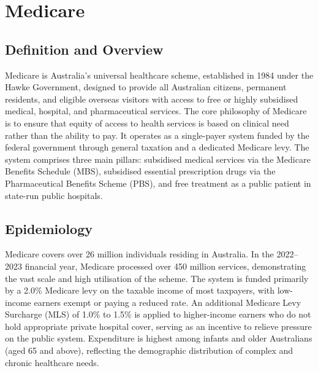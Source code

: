 \chapter{Medicare}

\section*{Definition and Overview}
Medicare is Australia's universal healthcare scheme, established in 1984 under the Hawke Government, designed to provide all Australian citizens, permanent residents, and eligible overseas visitors with access to free or highly subsidised medical, hospital, and pharmaceutical services. The core philosophy of Medicare is to ensure that equity of access to health services is based on clinical need rather than the ability to pay. It operates as a single-payer system funded by the federal government through general taxation and a dedicated Medicare levy. The system comprises three main pillars: subsidised medical services via the Medicare Benefits Schedule (MBS), subsidised essential prescription drugs via the Pharmaceutical Benefits Scheme (PBS), and free treatment as a public patient in state-run public hospitals.

\section*{Epidemiology}
Medicare covers over 26 million individuals residing in Australia. In the 2022--2023 financial year, Medicare processed over 450 million services, demonstrating the vast scale and high utilisation of the scheme. The system is funded primarily by a 2.0\% Medicare levy on the taxable income of most taxpayers, with low-income earners exempt or paying a reduced rate. An additional Medicare Levy Surcharge (MLS) of 1.0\% to 1.5\% is applied to higher-income earners who do not hold appropriate private hospital cover, serving as an incentive to relieve pressure on the public system. Expenditure is highest among infants and older Australians (aged 65 and above), reflecting the demographic distribution of complex and chronic healthcare needs.

